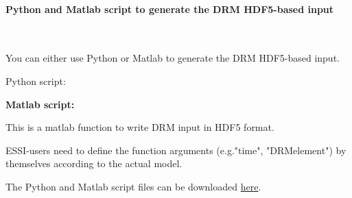 \documentclass[fleqn,11pt]{article}
\begin{document}
\paragraph{Python and Matlab script to generate the DRM HDF5-based input} ~

You can either use Python or Matlab to generate the DRM HDF5-based input.  

Python script:



\newpage
\textbf{Matlab script:}

This is a matlab function to write DRM input in HDF5 format. 

ESSI-users need to define the function arguments (e.g."time", "DRMelement") by themselves according to the actual model. 



The Python and Matlab script files can be downloaded \href{https://github.com/yuan-energy/Real-ESSI-Examples/blob/master/model_fei_file/Script_to_Generate_DRM_input/Script_to_Generate_DRM_input.tgz?raw=true}{here}.





\end{document}
